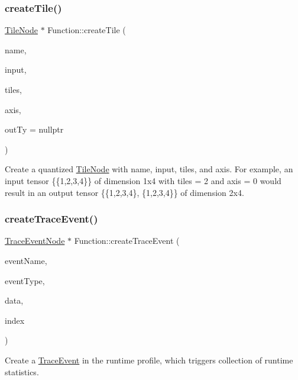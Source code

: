 \subsubsection{\texorpdfstring{create\+Tile()}{createTile()}}
{\footnotesize\ttfamily \hyperlink{classglow_1_1_tile_node}{Tile\+Node} $\ast$ Function\+::create\+Tile (\begin{DoxyParamCaption}\item[{llvm\+::\+String\+Ref}]{name,  }\item[{\hyperlink{structglow_1_1_node_value}{Node\+Value}}]{input,  }\item[{\hyperlink{namespaceglow_a0ca574644e1e42ef193a9947fb4d8911}{unsigned\+\_\+t}}]{tiles,  }\item[{\hyperlink{namespaceglow_a0ca574644e1e42ef193a9947fb4d8911}{unsigned\+\_\+t}}]{axis,  }\item[{\hyperlink{structglow_1_1_type}{Type\+Ref}}]{out\+Ty = {\ttfamily nullptr} }\end{DoxyParamCaption})}

Create a quantized \hyperlink{classglow_1_1_tile_node}{Tile\+Node} with {\ttfamily name}, {\ttfamily input}, {\ttfamily tiles}, and {\ttfamily axis}. For example, an input tensor \{\{1,2,3,4\}\} of dimension 1x4 with tiles = 2 and axis = 0 would result in an output tensor \{\{1,2,3,4\}, \{1,2,3,4\}\} of dimension 2x4. \mbox{\label{classglow_1_1_function_a85bff46320d22692796a98c44c785d36}} 
\subsubsection{\texorpdfstring{create\+Trace\+Event()}{createTraceEvent()}}
{\footnotesize\ttfamily \hyperlink{classglow_1_1_trace_event_node}{Trace\+Event\+Node} $\ast$ Function\+::create\+Trace\+Event (\begin{DoxyParamCaption}\item[{llvm\+::\+String\+Ref}]{event\+Name,  }\item[{llvm\+::\+String\+Ref}]{event\+Type,  }\item[{\hyperlink{classglow_1_1_node}{Node} $\ast$}]{data,  }\item[{unsigned}]{index }\end{DoxyParamCaption})}

Create a \hyperlink{structglow_1_1_trace_event}{Trace\+Event} in the runtime profile, which triggers collection of runtime statistics. \mbox{\label{classglow_1_1_function_ab511da8a4555e0e9b7e62b2f378716c9}} 
